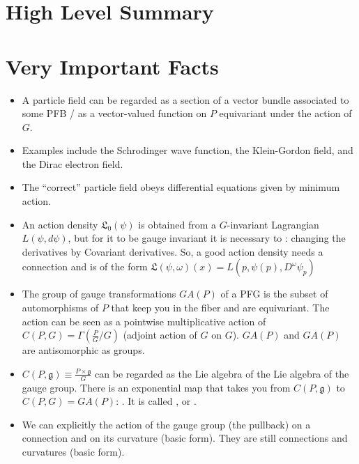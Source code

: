 \documentclass[12pt]{report}
\begin{document}
\section{High Level Summary}

\section{Very Important Facts}
\begin{itemize}
    \item A particle field can be regarded as a section of a vector bundle associated to some PFB / as a vector-valued function on $P$ equivariant under the action of $G$.
    
    \item Examples include the Schrodinger wave function, the Klein-Gordon field, and the Dirac electron field.
    
    \item The ``correct'' particle field obeys differential equations given by minimum action.
    
    \item An action density $\mathfrak L_0(\psi)$ is obtained from a $G$-invariant Lagrangian $L(\psi, d\psi)$, but for it to be gauge invariant it is necessary to  : changing the derivatives by Covariant derivatives. So, a good action density needs a connection and is of the form $\mathfrak L(\psi, \omega)(x) = L(p, \psi(p), D^\omega \psi_p)$
    
    \item The group of gauge transformations $GA(P)$ of a PFG is the subset of automorphisms of $P$ that keep you in the fiber and are equivariant. The action can be seen as a pointwise multiplicative action of $C(P, G) = \Gamma(\frac{P}{G}/G)$ (adjoint action of $G$ on $G$). $GA(P)$ and $GA(P)$ are antisomorphic as groups.
    
    \item $C(P, \mathfrak g) \equiv \frac{P \times \mathfrak g}{G}$ can be regarded as the Lie algebra of the Lie algebra of the gauge group. There is an exponential map that takes you from $C(P, \mathfrak g)$ to $C(P, G) = GA(P)$: . It is called ,  or .
    
    \item We can explicitly the action of the gauge group (the pullback) on a connection and on its curvature (basic form). They are still connections and curvatures (basic form).
    

\end{itemize}
\end{document}
